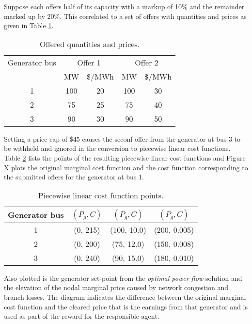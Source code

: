 Suppose each offers half of its capacity with a markup of 10\% and the
remainder marked up by 20\%.  This correlated to a set of offers with
quantities and prices as given in Table \ref{tbl:ex_offers}.
\begin{table}
\begin{center}
\begin{tabular}{|c|cc|cc|}
\hline
Generator bus & \multicolumn{2}{c}{Offer 1} & \multicolumn{2}{|c|}{Offer 2}\\
 & MW & \$/MWh & MW & \$/MWh \\
\hline
1 & 100 & 20 & 100 & 30 \\
2 & 75  & 25 & 75  & 40 \\
3 & 90  & 30 & 90  & 50 \\
\hline
\end{tabular}
\end{center}
\caption{Offered quantities and prices.}
\label{tbl:ex_offers}
\end{table}
Setting a price
cap of \$45 causes the seconf offer from the generator at bus 3 to be withheld
and ignored in the conversion to piecewise linear cost functions.  Table
\ref{tbl:ex_pwl} lists the points of the resulting piecewise linear cost
functions and Figure X plots the original marginal cost function and the cost
function corresponding to the submitted offers for the generator at bus 1.
\begin{table}
\begin{center}
\begin{tabular}{c|c|c|c}
\hline
Generator bus & $(P_g, C)$ & $(P_g, C)$ & $(P_g, C)$ \\
\hline
1 & (0, 215) & (100, 10.0) & (200, 0.005) \\
2 & (0, 200) & (75, 12.0) & (150, 0.008) \\
3 & (0, 240) & (90, 15.0) & (180, 0.010) \\
\hline
\end{tabular}
\end{center}
\caption{Piecewise linear cost function points.}
\label{tbl:ex_pwl}
\end{table}
Also plotted is the generator set-point from the \textit{optimal power flow}
solution and the elevation of the nodal marginal price caused by network
congestion and branch losses.  The diagram indicates the difference between the
original marginal cost function and the cleared price that is the earnings from
that generator and is used as part of the reward for the responsible agent.

